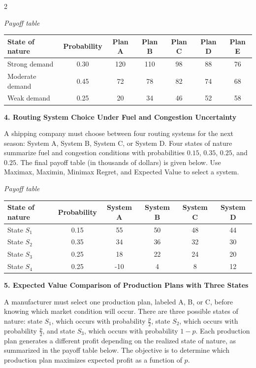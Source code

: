 \documentclass[12pt]{article}
\newcommand{\SubsectionBox}[1]{%
	\noindent\colorbox{gray!30}{%
		\parbox{\linewidth}{\textbf{#1}}%
	}\par\vspace{0.35cm}%
}
\begin{document}
\begin{multicols}{2}
		\begin{center}
			\textit{Payoff table} \\
			\begin{tabular}{l c c c c c c}
				\hline
				State of nature & Probability & Plan A & Plan B & Plan C & Plan D & Plan E \\
				\hline
				Strong demand & 0.30 & 120 & 110 & 98 & 88 & 76 \\
				Moderate demand & 0.45 & 72 & 78 & 82 & 74 & 68 \\
				Weak demand & 0.25 & 20 & 34 & 46 & 52 & 58 \\
				\hline
			\end{tabular}
		\end{center}
		
		\vspace{0.25cm}
		\SubsectionBox{4. Routing System Choice Under Fuel and Congestion Uncertainty}\vspace{-0.25cm}
		A shipping company must choose between four routing systems for the next season: System A, System B,
		System C, or System D. Four states of nature summarize fuel and congestion conditions
		with probabilities $0.15$, $0.35$, $0.25$, and $0.25$. The final payoff table (in thousands of dollars)
		is given below. Use Maximax, Maximin, Minimax Regret, and Expected Value to select a system.
		
		\begin{center}
			\textit{Payoff table} \\
			\begin{tabular}{l c c c c c}
				\hline
				State of nature & Probability & System A & System B & System C & System D \\
				\hline
				State $S_1$ & 0.15 & 55 & 50 & 48 & 44 \\
				State $S_2$ & 0.35 & 34 & 36 & 32 & 30 \\
				State $S_3$ & 0.25 & 18 & 22 & 24 & 20 \\
				State $S_4$ & 0.25 & -10 & 4 & 8 & 12 \\
				\hline
			\end{tabular}
		\end{center}
		
		\vspace{0.25cm}
		\SubsectionBox{5. Expected Value Comparison of Production Plans with Three States}\vspace{-0.25cm}
		A manufacturer must select one production plan, labeled A, B, or C, before knowing which market condition will occur.
		There are three possible states of nature: state $S_1$, which occurs with probability $\frac{p}{2}$,
		state $S_2$, which occurs with probability $\frac{p}{2}$, and state $S_3$, which occurs with probability $1-p$.
		Each production plan generates a different profit depending on the realized state of nature, as summarized in the payoff table below.
		The objective is to determine which production plan maximizes expected profit as a function of $p$.
		

\end{multicols}
\end{document}
